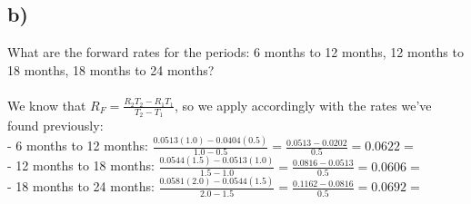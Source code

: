 \documentclass{article}
\begin{document}
{\subsection*{b)}
What are the forward rates for the periods: 6 months to 12 months, 12 months to 18 months, 18 months to 24 months? \\ \\ 
We know that \(R_F = \frac{R_2 T_2 - R_1 T_1}{T_2 - T_1}\), so we apply accordingly with the rates we've found previously: \\
- 6 months to 12 months: \(\frac{0.0513(1.0) - 0.0404(0.5)}{1.0 - 0.5} = \frac{0.0513 - 0.0202}{0.5} = 0.0622 = \)  \\
- 12 months to 18 months: \(\frac{0.0544(1.5) - 0.0513(1.0)}{1.5 - 1.0} = \frac{0.0816 - 0.0513}{0.5} = 0.0606 = \)  \\
- 18 months to 24 months: \(\frac{0.0581(2.0) - 0.0544(1.5)}{2.0 - 1.5} = \frac{0.1162 - 0.0816}{0.5} = 0.0692 = \) 

}
\end{document}
